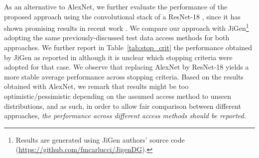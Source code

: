 \documentclass{article}
\begin{document}
As an alternative to AlexNet, we further evaluate the performance of the proposed approach using the convolutional stack of a ResNet-18 \cite{he2016deep}, since it has shown promising results in recent work \cite{carlucci2019domain}. We compare our approach with JiGen\footnote{\label{fn:jigen}Results are generated using JiGen authors' source code (\url{https://github.com/fmcarlucci/JigenDG}).} adopting the same previously-discussed test data access methods for both approaches. We further report in Table~\ref{tab:stop_crit} the performance obtained by JiGen as reported in \cite{carlucci2019domain} although it is unclear which stopping criteria were adopted for that case. We observe that replacing AlexNet by ResNet-18 yields a more stable average performance across stopping criteria. Based on the results obtained with AlexNet, we remark that results might be too optimistic/pessimistic depending on the assumed access method to unseen distributions, and as such, in order to allow fair comparison between different approaches, \emph{the performance across different access methods should be reported}.
\end{document}
